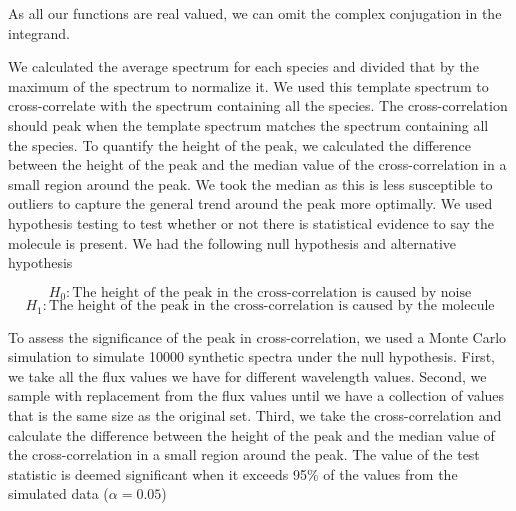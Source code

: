 \documentclass[twoside, single, authoryear, semicolon, 12pt]{lion-msc}
\newcommand{\4}{$_4$}
\newcommand{\3}{$_3$}
\newcommand{\2}{$_2$}
\begin{document}


As all our functions are real valued, we can omit the complex conjugation in the integrand.

We calculated the average spectrum for each species and divided that by the maximum of the spectrum to normalize it. We used this template spectrum to cross-correlate with the spectrum containing all the species. The cross-correlation should peak when the template spectrum matches the spectrum containing all the species. To quantify the height of the peak, we calculated the difference between the height of the peak and the median value of the cross-correlation in a small region around the peak. We took the median as this is less susceptible to outliers to capture the general trend around the peak more optimally. We used hypothesis testing to test whether or not there is statistical evidence to say the molecule is present. We had the following null hypothesis and alternative hypothesis

\begin{equation}
    H_0: \text{The height of the peak in the cross-correlation is caused by noise}
\end{equation}
\begin{equation}
    H_1: \text{The height of the peak in the cross-correlation is caused by the molecule}
\end{equation}

To assess the significance of the peak in cross-correlation, we used a Monte Carlo simulation to simulate 10000 synthetic spectra under the null hypothesis. First, we take all the flux values we have for different wavelength values. Second, we sample with replacement from the flux values until we have a collection of values that is the same size as the original set. Third, we take the cross-correlation and calculate the difference between the height of the peak and the median value of the cross-correlation in a small region around the peak. The value of the test statistic is deemed significant when it exceeds 95\% of the values from the simulated data ($\alpha=0.05$)
\end{document}

